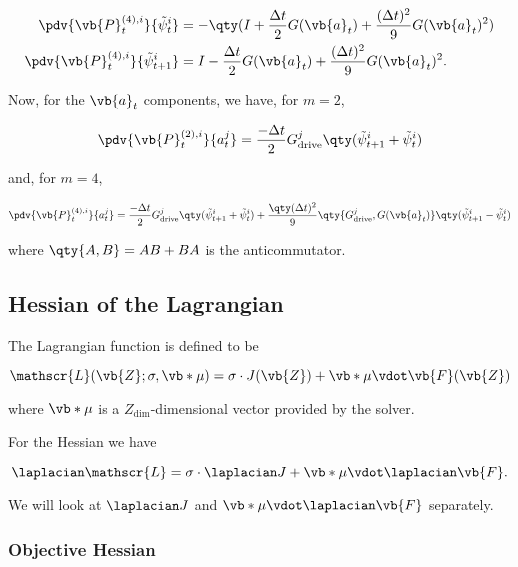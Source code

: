 \documentclass{article}
\newcommand{\isopsi}{\tilde \psi}
\begin{document}
\begin{align}
  \pdv{\vb{P}_t^{(4),i}}{\isopsi^i_t} &= -\qty(I + \frac{\Delta t}{2}G(\vb{a}_t) + \frac{(\Delta t)^2}{9} G(\vb{a}_t)^2) \\
  \pdv{\vb{P}_t^{(4),i}}{\isopsi^i_{t+1}} &= I - \frac{\Delta t}{2}G(\vb{a}_t) + \frac{(\Delta t)^2}{9} G(\vb{a}_t)^2.
\end{align}


Now, for the $\vb{a}_t$ components, we have, for $m = 2$,

\begin{equation}
  \pdv{\vb{P}_t^{(2),i}}{a^j_t} 
    = \frac{-\Delta t}{2} G^j_{\text{drive}} \qty(\isopsi^i_{t+1} + \isopsi^i_{t})
\end{equation}

and, for $m = 4$,

\begin{equation}
  \pdv{\vb{P}_t^{(4),i}}{a^j_t} 
    = \frac{-\Delta t}{2} G^j_{\text{drive}} \qty(\isopsi^i_{t+1} + \isopsi^i_{t}) + \frac{\qty(\Delta t)^2}{9} \qty{G^j_{\text{drive}}, G(\vb{a}_t)}\qty(\isopsi^i_{t+1} - \isopsi^i_{t})
\end{equation}

where $\qty{A, B} = AB + BA$ is the anticommutator. 


\newpage

\subsection{Hessian of the Lagrangian}

The Lagrangian function is defined to be

\begin{equation}
  \mathscr{L}(\vb{Z}; \sigma, \vb*{\mu}) = \sigma \cdot J(\vb{Z}) + \vb*{\mu} \vdot \vb{F}(\vb{Z})
\end{equation}

where $\vb*{\mu}$ is a $Z_{\dim}$-dimensional vector provided by the solver.

\hfill

For the Hessian we have 

\begin{equation}
  \laplacian \mathscr{L} = \sigma \cdot \laplacian J + \vb*{\mu} \vdot \laplacian \vb{F}.
\end{equation}

We will look at $\laplacian J$ and $\vb*{\mu} \vdot \laplacian \vb{F}$ separately.

\subsubsection*{Objective Hessian}
\end{document}
